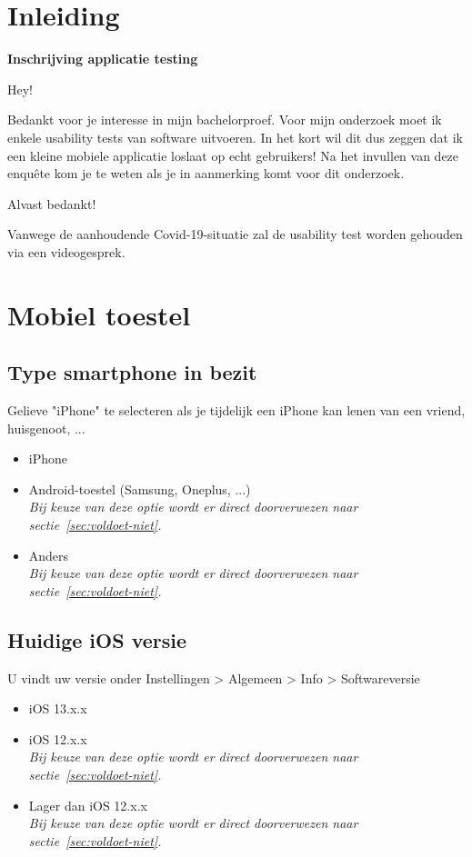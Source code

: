 \section{Inleiding}

\textbf{Inschrijving applicatie testing}

Hey!

Bedankt voor je interesse in mijn bachelorproef. Voor mijn onderzoek moet ik enkele usability tests van software uitvoeren. In het kort wil dit dus zeggen dat ik een kleine mobiele applicatie loslaat op echt gebruikers! Na het invullen van deze enquête kom je te weten als je in aanmerking komt voor dit onderzoek.

Alvast bedankt!

Vanwege de aanhoudende Covid-19-situatie zal de usability test worden gehouden via een videogesprek.

\section{Mobiel toestel}

\subsection*{Type smartphone in bezit}

Gelieve "iPhone" te selecteren als je tijdelijk een iPhone kan lenen van een vriend, huisgenoot, ...

\begin{itemize}
    \item iPhone
    \item Android-toestel (Samsung, Oneplus, ...) \\ \textit{Bij keuze van deze optie wordt er direct doorverwezen naar sectie~\ref{sec:voldoet-niet}.}
    \item Anders \\ \textit{Bij keuze van deze optie wordt er direct doorverwezen naar sectie~\ref{sec:voldoet-niet}.}
\end{itemize}

\subsection*{Huidige iOS versie}

U vindt uw versie onder Instellingen > Algemeen > Info > Softwareversie

\begin{itemize}
    \item iOS 13.x.x
    \item iOS 12.x.x \\ \textit{Bij keuze van deze optie wordt er direct doorverwezen naar sectie~\ref{sec:voldoet-niet}.}
    \item Lager dan iOS 12.x.x \\ \textit{Bij keuze van deze optie wordt er direct doorverwezen naar sectie~\ref{sec:voldoet-niet}.}
\end{itemize}

